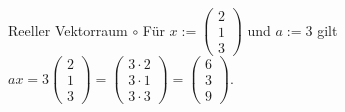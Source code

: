\documentclass[
  8pt,
  ignorenonframetext,
]{beamer}
\begin{document}
\begin{frame}{Reeller Vektorraum}
\(\circ\) Für \(x:= \begin{pmatrix} 2 \\ 1 \\ 3 \end{pmatrix}\) und
\(a := 3\) gilt
\(ax = 3 \begin{pmatrix} 2 \\ 1 \\ 3 \end{pmatrix} = \begin{pmatrix} 3 \cdot 2 \\ 3 \cdot 1 \\ 3 \cdot 3 \end{pmatrix} = \begin{pmatrix} 6 \\ 3 \\ 9 \end{pmatrix}\).
\end{frame}
\end{document}
